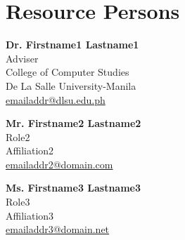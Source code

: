 %
%
%                 

\chapter{Resource Persons}
\label{sec:appendixc}

%
%
%
%

%
%
\newcommand{\resperson}[4]{\noindent\textbf{#1} \\ #2 \\ #3 \\ \url{#4}\par\vspace{0.8em}}

\resperson{Dr. Firstname1 Lastname1}{Adviser}{College of Computer Studies\\De La Salle University-Manila}{emailaddr@dlsu.edu.ph}
\resperson{Mr. Firstname2 Lastname2}{Role2}{Affiliation2}{emailaddr2@domain.com}
\resperson{Ms. Firstname3 Lastname3}{Role3}{Affiliation3}{emailaddr3@domain.net}


